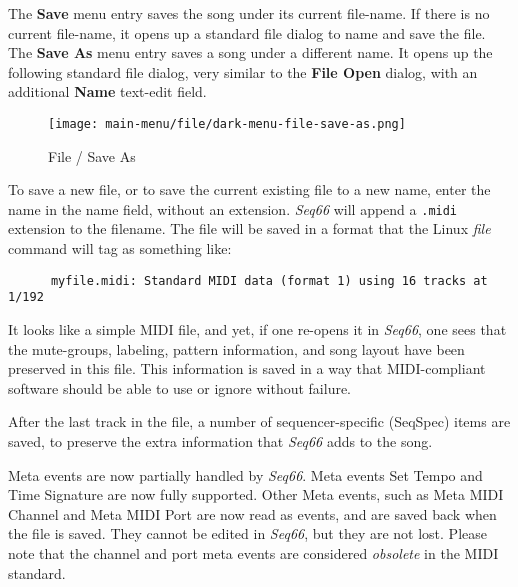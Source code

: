    The \textbf{Save} menu entry saves the song under its current file-name.
   If there is no current file-name, it opens up a standard file
   dialog to name and save the file.
   The \textbf{Save As} menu entry saves a song under a different name.
   It opens up the following standard file dialog, very similar to the 
   \textbf{File Open} dialog, with an additional \textbf{Name} text-edit field.

\begin{figure}[H]
   \centering 
   \texttt{[image: main-menu/file/dark-menu-file-save-as.png]}
   \caption{File / Save As}
   \label{fig:seq66_menu_file_save_as}
\end{figure}

   To save a new file, or to save the current existing file to a new name,
   enter the name in the name field, without an extension.
   \textsl{Seq66} will append a \texttt{.midi} extension to the filename.
   The file will be saved in a format that the Linux \textsl{file} command
   will tag as something like:

   \begin{verbatim}
      myfile.midi: Standard MIDI data (format 1) using 16 tracks at 1/192
   \end{verbatim}

   It looks like a simple MIDI file, and yet, if one re-opens it in
   \textsl{Seq66}, one sees that the mute-groups, labeling, pattern
   information, and song layout have been preserved in this file.
   This information is saved in a way that MIDI-compliant software
   should be able to use or ignore without failure.

   After the last track in the file, a number of
   sequencer-specific (SeqSpec) items are saved, to preserve
   the extra information that \textsl{Seq66} adds to the song.

   Meta events are now partially handled by \textsl{Seq66}.
   Meta events Set Tempo
   and Time Signature
   are now fully supported.
   Other Meta events,
   such as Meta MIDI Channel
   and Meta MIDI Port
   are now read as events, and are saved back when the file is saved.
   They cannot be edited in \textsl{Seq66}, but they are not lost.
   Please note that the channel and port meta events are
   considered \textsl{obsolete} in the MIDI standard.

